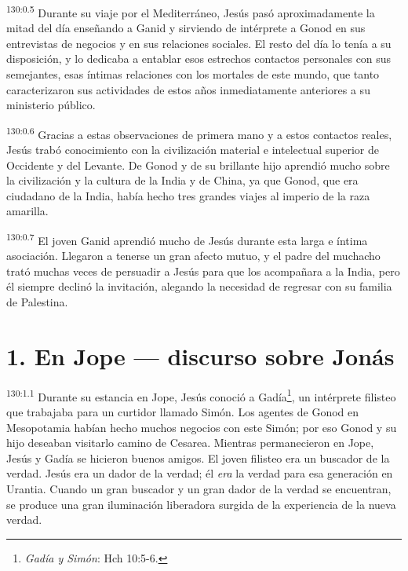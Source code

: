 \par 
\textsuperscript{130:0.5} Durante su viaje por el Mediterráneo, Jesús pasó aproximadamente la mitad del día enseñando a Ganid y sirviendo de intérprete a Gonod en sus entrevistas de negocios y en sus relaciones sociales. El resto del día lo tenía a su disposición, y lo dedicaba a entablar esos estrechos contactos personales con sus semejantes, esas íntimas relaciones con los mortales de este mundo, que tanto caracterizaron sus actividades de estos años inmediatamente anteriores a su ministerio público.

\par 
\textsuperscript{130:0.6} Gracias a estas observaciones de primera mano y a estos contactos reales, Jesús trabó conocimiento con la civilización material e intelectual superior de Occidente y del Levante. De Gonod y de su brillante hijo aprendió mucho sobre la civilización y la cultura de la India y de China, ya que Gonod, que era ciudadano de la India, había hecho tres grandes viajes al imperio de la raza amarilla.

\par 
\textsuperscript{130:0.7} El joven Ganid aprendió mucho de Jesús durante esta larga e íntima asociación. Llegaron a tenerse un gran afecto mutuo, y el padre del muchacho trató muchas veces de persuadir a Jesús para que los acompañara a la India, pero él siempre declinó la invitación, alegando la necesidad de regresar con su familia de Palestina.

\section*{1. En Jope --- discurso sobre Jonás}
\par 
\textsuperscript{130:1.1} Durante su estancia en Jope, Jesús conoció a Gadía\footnote{\textit{Gadía y Simón}: Hch 10:5-6.}, un intérprete filisteo que trabajaba para un curtidor llamado Simón. Los agentes de Gonod en Mesopotamia habían hecho muchos negocios con este Simón; por eso Gonod y su hijo deseaban visitarlo camino de Cesarea. Mientras permanecieron en Jope, Jesús y Gadía se hicieron buenos amigos. El joven filisteo era un buscador de la verdad. Jesús era un dador de la verdad; él \textit{era} la verdad para esa generación en Urantia. Cuando un gran buscador y un gran dador de la verdad se encuentran, se produce una gran iluminación liberadora surgida de la experiencia de la nueva verdad.

